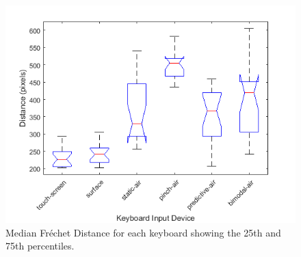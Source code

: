 \begin{figure}[t]
	\centering
	\includegraphics{Figures/fig_frechet_boxplot}
	\caption[Fr\'echet Distance Boxplot]{Median Fr\'echet Distance for each keyboard showing the 25th and 75th percentiles.}
	\label{fig_frechet_boxplot}
\end{figure}

